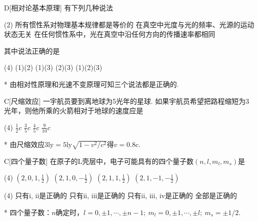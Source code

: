 \begin{choice}{D}[相对论基本原理]
有下列几种说法
\begin{tasks}(2)
    \task[(1)] 所有惯性系对物理基本规律都是等价的
    \task[(2)] 在真空中光度与光的频率、光源的运动状态无关
    \task*[(3)] 在任何惯性系中，光在真空中沿任何方向的传播速率都相同
\end{tasks}

其中说法正确的是
\begin{tasks}(4)
    \task (1)(2)
    \task (1)(3)
    \task (2)(3)
    \task (1)(2)(3)
\end{tasks}
\end{choice}
\begin{solution}*
    由相对性原理和光速不变原理可知三个说法都是正确的.
\end{solution}

\begin{choice}{C}[尺缩效应]
    一宇航员要到离地球为5光年的星球. 如果宇航员希望把路程缩短为3光年，则他所乘的火箭相对于地球的速度应是
\begin{tasks}(4)
    \task $\frac{1}{2}c$
    \task $\frac{3}{5}c$
    \task $\frac{4}{5}c$
    \task $\frac{9}{10}c$
\end{tasks}
\end{choice}
\begin{solution}*
    由尺缩效应$3\mathrm{ly}=5\mathrm{ly}\sqrt{1-v^2/c^2}$得$v=0.8\mathrm{c}$.
\end{solution}

\begin{choice}{C}[四个量子数]
    在原子的L壳层中，电子可能具有的四个量子数$(n,l,m_l,m_s)$是
\begin{tasks}[label=\roman*.](4)
    \task $(2,0,1,\frac{1}{2})$
    \task $(2,1,0,-\frac{1}{2})$
    \task $(2,1,1,\frac{1}{2})$
    \task $(2,1,-1,-\frac{1}{2})$
\end{tasks}
\begin{tasks}(4)
    \task 只有i, ii是正确的
    \task 只有ii, iii是正确的
    \task 只有ii, iii, iv是正确的
    \task 全部是正确的
\end{tasks}
\end{choice}
\begin{solution}*
    四个量子数：$n$确定时，$l=0,\pm 1,\cdots,\pm n-1;\ m_l=0,\pm 1,\cdots,\pm l;\ m_s=\pm1/2$.
\end{solution}

